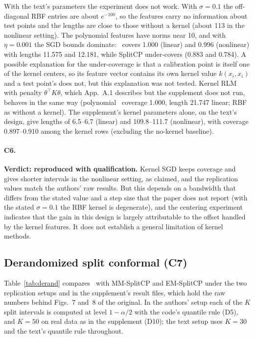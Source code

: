 With the text's parameters the experiment does not work. With $\sigma=0.1$ the off-diagonal RBF entries are about
$e^{-100}$, so the features carry no information about test points and the lengths are close to those without a
kernel (about 113 in the nonlinear setting). The polynomial features have norms near 10, and with $\eta=0.001$ the SGD bounds
dominate: \LOO\ covers 1.000 (linear) and 0.996 (nonlinear) with lengths 11.575 and 12.181, while SplitCP under-covers
(0.883 and 0.784). A possible explanation for the under-coverage is that a calibration point is itself one of the kernel centers,
so its feature vector contains its own kernel value $k(x_i,x_i)$ and a test point's does not, but this explanation was not tested. Kernel RLM with penalty $\theta^\top K\theta$, which App.~A.1 describes but the supplement does not run, behaves
in the same way (polynomial \LOO\ coverage 1.000, length 21.747 linear; RBF as without a kernel). The supplement's
kernel parameters alone, on the text's design, give lengths of 6.5--6.7 (linear) and 109.8--111.7 (nonlinear), with
coverage 0.897--0.910 among the kernel rows (excluding the no-kernel baseline).

\paragraph{C6.} \textbf{Verdict: reproduced with qualification.} Kernel SGD keeps coverage and gives shorter intervals
in the nonlinear setting, as claimed, and the replication values match the authors' raw results. But this depends on a bandwidth that differs from the stated value and a
step size that the paper does not report (with the stated $\sigma=0.1$ the RBF kernel is degenerate), and the centering experiment indicates that the gain in this design is largely attributable to the offset handled by the kernel features. It does not establish a general limitation of kernel methods.

\subsection{Derandomized split conformal (C7)}

Table~\ref{tab:derand} compares \LOO\ with MM-SplitCP and EM-SplitCP under the two replication setups and in the supplement's
result files, which hold the raw numbers behind Figs.~7 and~8 of the original. In the authors' setup each of the $K$
split intervals is computed at level $1-\alpha/2$ with the code's quantile rule (D5), and $K=50$ on real data as in
the supplement (D10); the text setup uses $K=30$ and the text's quantile rule throughout.

